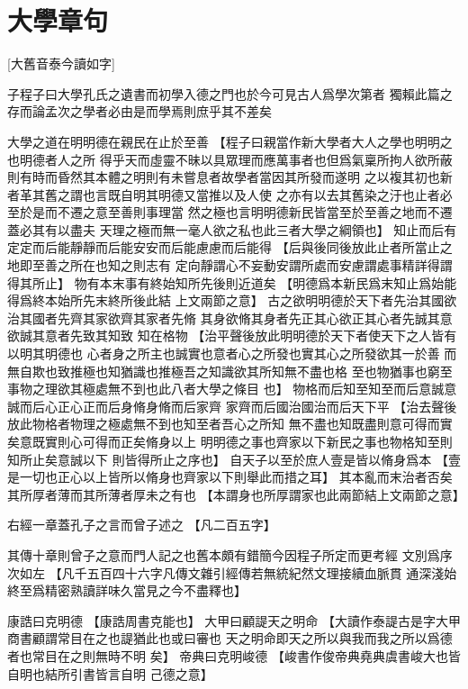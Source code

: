 \documentclass{zhvt-classic}
\begin{document}
\chapter*[]{大學章句}[大舊音泰今讀如字]

\begin{preface}
子程子曰大學孔氏之遺書而初學入德之門也於今可見古人爲學次第者
獨賴此篇之存而論孟次之學者必由是而學焉則庶乎其不差矣
\end{preface}

大學之道在明明德在親民在止於至善
  【程子曰親當作新大學者大人之學也明明之也明德者人之所
    得乎天而虛靈不昧以具眾理而應萬事者也但爲氣稟所拘人欲所蔽
    則有時而昏然其本體之明則有未嘗息者故學者當因其所發而遂明
    之以複其初也新者革其舊之謂也言既自明其明德又當推以及人使
    之亦有以去其舊染之汙也止者必至於是而不遷之意至善則事理當
    然之極也言明明德新民皆當至於至善之地而不遷蓋必其有以盡夫
    天理之極而無一毫人欲之私也此三者大學之綱領也】
知止而后有定定而后能靜靜而后能安安而后能慮慮而后能得
  【后與後同後放此止者所當止之地即至善之所在也知之則志有
    定向靜謂心不妄動安謂所處而安慮謂處事精詳得謂得其所止】
物有本末事有終始知所先後則近道矣
  【明德爲本新民爲末知止爲始能得爲終本始所先末終所後此結
    上文兩節之意】
古之欲明明德於天下者先治其國欲治其國者先齊其家欲齊其家者先脩
其身欲脩其身者先正其心欲正其心者先誠其意欲誠其意者先致其知致
知在格物
  【治平聲後放此明明德於天下者使天下之人皆有以明其明德也
    心者身之所主也誠實也意者心之所發也實其心之所發欲其一於善
    而無自欺也致推極也知猶識也推極吾之知識欲其所知無不盡也格
    至也物猶事也窮至事物之理欲其極處無不到也此八者大學之條目
    也】
物格而后知至知至而后意誠意誠而后心正心正而后身脩身脩而后家齊
家齊而后國治國治而后天下平
  【治去聲後放此物格者物理之極處無不到也知至者吾心之所知
    無不盡也知既盡則意可得而實矣意既實則心可得而正矣脩身以上
    明明德之事也齊家以下新民之事也物格知至則知所止矣意誠以下
    則皆得所止之序也】
自天子以至於庶人壹是皆以脩身爲本
  【壹是一切也正心以上皆所以脩身也齊家以下則舉此而措之耳】
其本亂而末治者否矣其所厚者薄而其所薄者厚未之有也
  【本謂身也所厚謂家也此兩節結上文兩節之意】

\begin{preface}
右經一章蓋孔子之言而曾子述之
  【凡二百五字】

其傳十章則曾子之意而門人記之也舊本頗有錯簡今因程子所定而更考經
文別爲序次如左
  \zhvph【凡千五百四十六字凡傳文雜引經傳若無統紀然文理接續血脈貫
    通深淺始終至爲精密熟讀詳味久當見之今不盡釋也】
\end{preface}

康誥曰克明德
  【康誥周書克能也】
大甲曰顧諟天之明命
  【大讀作泰諟古是字大甲商書顧謂常目在之也諟猶此也或曰審也
    天之明命即天之所以與我而我之所以爲德者也常目在之則無時不明
    矣】
帝典曰克明峻德
  【峻書作俊帝典堯典虞書峻大也皆自明也結所引書皆言自明
    己德之意】
\end{document}
